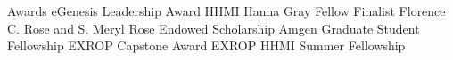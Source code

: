 \begin{rubric}{Awards}
    \entry*[2020]
      eGenesis Leadership Award
    \entry*[2019]
        HHMI Hanna Gray Fellow Finalist
    \entry*[2015]
      Florence C. Rose and S. Meryl Rose Endowed Scholarship
    \entry*[2014]
      Amgen Graduate Student Fellowship
    \entry*[2012]
      EXROP Capstone Award
    \entry*[2011]
      EXROP HHMI Summer Fellowship
\end{rubric}
    